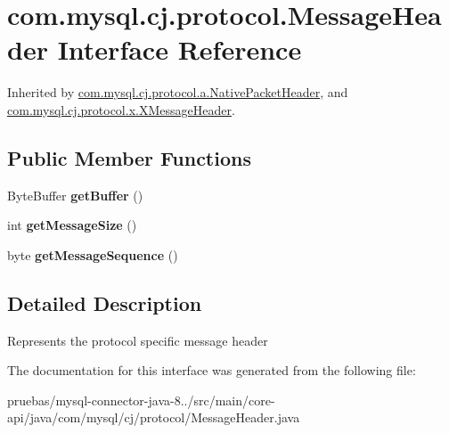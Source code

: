 \hypertarget{interfacecom_1_1mysql_1_1cj_1_1protocol_1_1_message_header}{}\section{com.\+mysql.\+cj.\+protocol.\+Message\+Header Interface Reference}
\label{interfacecom_1_1mysql_1_1cj_1_1protocol_1_1_message_header}


Inherited by \mbox{\hyperlink{classcom_1_1mysql_1_1cj_1_1protocol_1_1a_1_1_native_packet_header}{com.\+mysql.\+cj.\+protocol.\+a.\+Native\+Packet\+Header}}, and \mbox{\hyperlink{classcom_1_1mysql_1_1cj_1_1protocol_1_1x_1_1_x_message_header}{com.\+mysql.\+cj.\+protocol.\+x.\+X\+Message\+Header}}.

\subsection*{Public Member Functions}
\begin{DoxyCompactItemize}
\item 
\mbox{\label{interfacecom_1_1mysql_1_1cj_1_1protocol_1_1_message_header_a623366dac16a7c2c5a879588afc4ed92}} 
Byte\+Buffer {\bfseries get\+Buffer} ()
\item 
\mbox{\label{interfacecom_1_1mysql_1_1cj_1_1protocol_1_1_message_header_a8192e2c73dd6c3ed31e569034950f163}} 
int {\bfseries get\+Message\+Size} ()
\item 
\mbox{\label{interfacecom_1_1mysql_1_1cj_1_1protocol_1_1_message_header_addc9db095cb10062d2a3b0e3ad180750}} 
byte {\bfseries get\+Message\+Sequence} ()
\end{DoxyCompactItemize}


\subsection{Detailed Description}
Represents the protocol specific message header 

The documentation for this interface was generated from the following file\+:\begin{DoxyCompactItemize}
\item 
pruebas/mysql-\/connector-\/java-\/8../src/main/core-\/api/java/com/mysql/cj/protocol/Message\+Header.\+java\end{DoxyCompactItemize}
